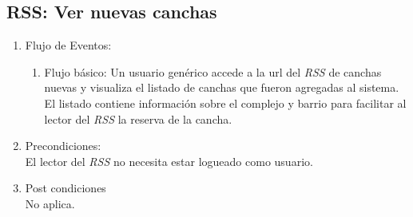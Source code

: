 \documentclass[a4paper,11pt]{article}
\begin{document}
\subsection{RSS: Ver nuevas canchas}
\begin{enumerate}


	\begin{enumerate}
		\item Descripción breve: \\
			Se listan las \'ultimas canchas agregadas al sistema.
		\item Actores \\
			Usuario gen\'erico, invitado.
	
		\item Disparadores: \\
			Acceso a la url del \emph{RSS} de canchas nuevas.

	\end{enumerate}

	\item Flujo de Eventos: 

	\begin{enumerate}
		\item Flujo básico:
			Un usuario gen\'erico accede a la url del \emph{RSS}  de canchas nuevas
			y visualiza el listado de canchas que fueron agregadas al sistema. El
			listado contiene informaci\'on sobre el complejo y barrio para facilitar
			al lector del \emph{RSS} la reserva de la cancha.
	\end{enumerate}

	\item Precondiciones: \\
		El lector del \emph{RSS} no necesita estar logueado como usuario.

	\item Post condiciones \\
		No aplica.

\end{enumerate}

\end{document}

